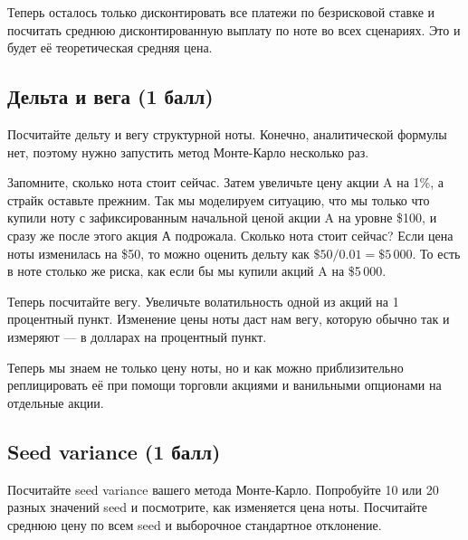 \documentclass[a4paper,14pt]{extarticle}
\begin{document}
Теперь осталось только дисконтировать все платежи по безрисковой ставке и 
посчитать среднюю дисконтированную выплату по ноте во всех сценариях. Это и 
будет её теоретическая средняя цена.

\subsection{Дельта и вега (1 балл)}

Посчитайте дельту и вегу структурной ноты. Конечно, аналитической формулы нет,
поэтому нужно запустить метод Монте-Карло несколько раз.

Запомните, сколько нота стоит сейчас. Затем увеличьте цену акции A на 1\%, а 
страйк оставьте прежним. Так мы моделируем ситуацию, что мы только что купили 
ноту с зафиксированным начальной ценой акции A на уровне \$100, и сразу же после этого акция А подрожала.
Сколько нота стоит сейчас? Если цена ноты изменилась на \$50, то можно оценить 
дельту как $\$50 / 0.01 = \$5\,000$. То есть в ноте столько же риска, как если
бы мы купили акций A на \$5\,000. 

Теперь посчитайте вегу. Увеличьте волатильность одной из акций на 1 процентный 
пункт. Изменение цены ноты даст нам вегу, которую обычно так и измеряют ---
в долларах на процентный пункт.

Теперь мы знаем не только цену ноты, но и как можно приблизительно реплицировать 
её при помощи торговли акциями и ванильными опционами на отдельные акции.

\subsection{Seed variance (1 балл)}

Посчитайте seed variance вашего метода Монте-Карло. Попробуйте 10 или 20
разных значений seed и посмотрите, как изменяется цена ноты. Посчитайте среднюю
цену по всем seed и выборочное стандартное отклонение.
\end{document}
